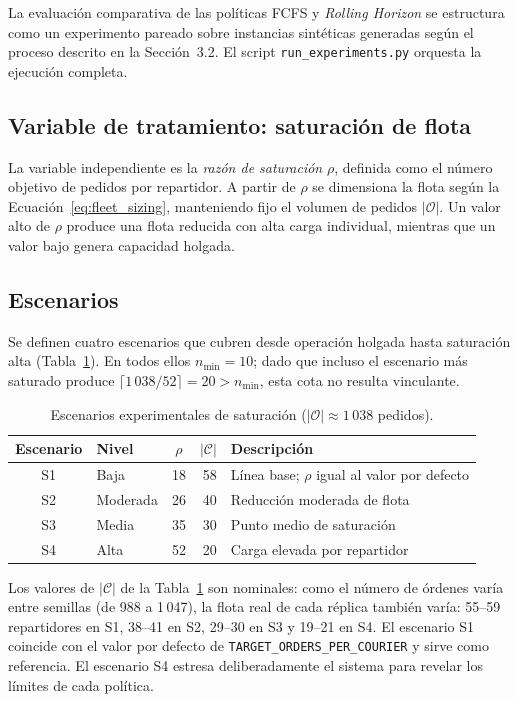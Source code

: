 \documentclass[12pt,letterpaper,oneside]{book}
\begin{document}
	La evaluación comparativa de las políticas FCFS y \textit{Rolling Horizon} se estructura
	como un experimento pareado sobre instancias sintéticas generadas según el proceso
	descrito en la Sección~3.2.  El script \texttt{run\_experiments.py} orquesta la
	ejecución completa.

	\subsection{Variable de tratamiento: saturación de flota}

	La variable independiente es la \emph{razón de saturación} $\rho$, definida como el
	número objetivo de pedidos por repartidor.  A partir de $\rho$ se dimensiona la flota
	según la Ecuación~\ref{eq:fleet_sizing}, manteniendo fijo el volumen de pedidos
	$|\mathcal{O}|$.  Un valor alto de $\rho$ produce una flota reducida con alta carga
	individual, mientras que un valor bajo genera capacidad holgada.

	\subsection{Escenarios}

	Se definen cuatro escenarios que cubren desde operación holgada hasta saturación
	alta (Tabla~\ref{tab:scenarios}).  En todos ellos $n_{\min} = 10$; dado que
	incluso el escenario más saturado produce $\lceil 1\,038 / 52 \rceil = 20 > n_{\min}$,
	esta cota no resulta vinculante.

	\begin{table}[htbp]
		\centering
		\caption{Escenarios experimentales de saturación ($|\mathcal{O}| \approx 1\,038$ pedidos).}
		\label{tab:scenarios}
		\begin{tabular}{clcrl}
			\toprule
			Escenario & Nivel    & $\rho$ & $|\mathcal{C}|$ & Descripción \\
			\midrule
			S1 & Baja     & 18 & 58 & Línea base; $\rho$ igual al valor por defecto \\
			S2 & Moderada & 26 & 40 & Reducción moderada de flota \\
			S3 & Media    & 35 & 30 & Punto medio de saturación \\
			S4 & Alta     & 52 & 20 & Carga elevada por repartidor \\
			\bottomrule
		\end{tabular}
	\end{table}

	Los valores de $|\mathcal{C}|$ de la Tabla~\ref{tab:scenarios} son nominales: como el
	número de órdenes varía entre semillas (de 988 a 1\,047), la flota real de cada réplica
	también varía: 55--59 repartidores en S1, 38--41 en S2, 29--30 en S3 y 19--21 en S4.  El escenario S1 coincide con el valor por defecto de
	\texttt{TARGET\_ORDERS\_PER\_COURIER} y sirve como referencia.  El escenario S4 estresa deliberadamente el sistema
	para revelar los límites de cada política.
\end{document}
